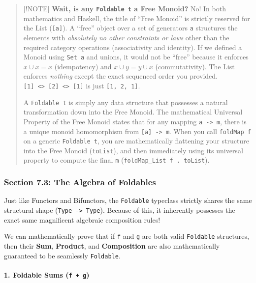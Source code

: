 \documentclass[
]{article}
\begin{document}
\begin{quote}
{[}!NOTE{]} \textbf{Wait, is any \texttt{Foldable\ t} a Free Monoid?}
No! In both mathematics and Haskell, the title of ``Free Monoid'' is
strictly reserved for the List (\texttt{{[}a{]}}). A ``free'' object
over a set of generators \texttt{a} structures the elements with
\emph{absolutely no other constraints or laws} other than the required
category operations (associativity and identity). If we defined a Monoid
using \texttt{Set\ a} and unions, it would not be ``free'' because it
enforces \(x \cup x = x\) (idempotency) and \(x \cup y = y \cup x\)
(commutativity). The List enforces \emph{nothing} except the exact
sequenced order you provided.
\texttt{{[}1{]}\ \textless{}\textgreater{}\ {[}2{]}\ \textless{}\textgreater{}\ {[}1{]}}
is just \texttt{{[}1,\ 2,\ 1{]}}.

A \texttt{Foldable\ t} is simply any data structure that possesses a
natural transformation down into the Free Monoid. The mathematical
Universal Property of the Free Monoid states that for any mapping
\texttt{a\ -\textgreater{}\ m}, there is a unique monoid homomorphism
from \texttt{{[}a{]}\ -\textgreater{}\ m}. When you call
\texttt{foldMap\ f} on a generic \texttt{Foldable\ t}, you are
mathematically flattening your structure into the Free Monoid
(\texttt{toList}), and then immediately using its universal property to
compute the final \texttt{m} (\texttt{foldMap\_List\ f\ .\ toList}).
\end{quote}

\subsubsection{Section 7.3: The Algebra of
Foldables}\label{section-7.3-the-algebra-of-foldables}

Just like Functors and Bifunctors, the \texttt{Foldable} typeclass
strictly shares the same structural shape
(\texttt{Type\ -\textgreater{}\ Type}). Because of this, it inherently
possesses the exact same magnificent algebraic composition rules!

We can mathematically prove that if \texttt{f} and \texttt{g} are both
valid \texttt{Foldable} structures, then their \textbf{Sum},
\textbf{Product}, and \textbf{Composition} are also mathematically
guaranteed to be seamlessly \texttt{Foldable}.

\paragraph{\texorpdfstring{1. Foldable Sums
(\texttt{f\ +\ g})}{1. Foldable Sums (f + g)}}\label{foldable-sums-f-g}
\end{document}
